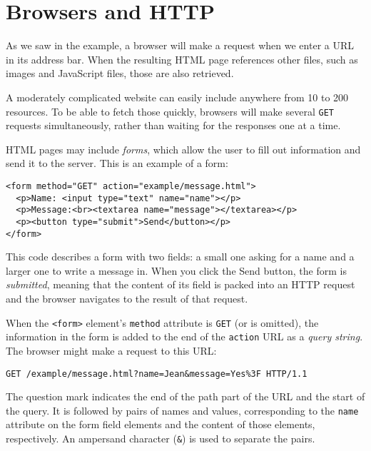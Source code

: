 \section{Browsers and HTTP}

As we saw in the example, a browser will make a request when we enter a URL in its address bar. When the resulting HTML page references other files, such as images and JavaScript files, those are also retrieved.

A moderately complicated website can easily include anywhere from 10 to 200 resources. To be able to fetch those quickly, browsers will make several \lstinline`GET` requests simultaneously, rather than waiting for the responses one at a time.

HTML pages may include \emph{forms}, which allow the user to fill out information and send it to the server. This is an example of a form:

\begin{lstlisting}
<form method="GET" action="example/message.html">
  <p>Name: <input type="text" name="name"></p>
  <p>Message:<br><textarea name="message"></textarea></p>
  <p><button type="submit">Send</button></p>
</form>
\end{lstlisting}
\noindent{}

This code describes a form with two fields: a small one asking for a name and a larger one to write a message in. When you click the Send button, the form is \emph{submitted}, meaning that the content of its field is packed into an HTTP request and the browser navigates to the result of that request.

When the \lstinline`<form>` element's \lstinline`method` attribute is \lstinline`GET` (or is omitted), the information in the form is added to the end of the \lstinline`action` URL as a \emph{query string}. The browser might make a request to this URL:

\begin{lstlisting}
GET /example/message.html?name=Jean&message=Yes%3F HTTP/1.1
\end{lstlisting}
\noindent{}

The question mark indicates the end of the path part of the URL and the start of the query. It is followed by pairs of names and values, corresponding to the \lstinline`name` attribute on the form field elements and the content of those elements, respectively. An ampersand character (\lstinline`&`) is used to separate the pairs.

